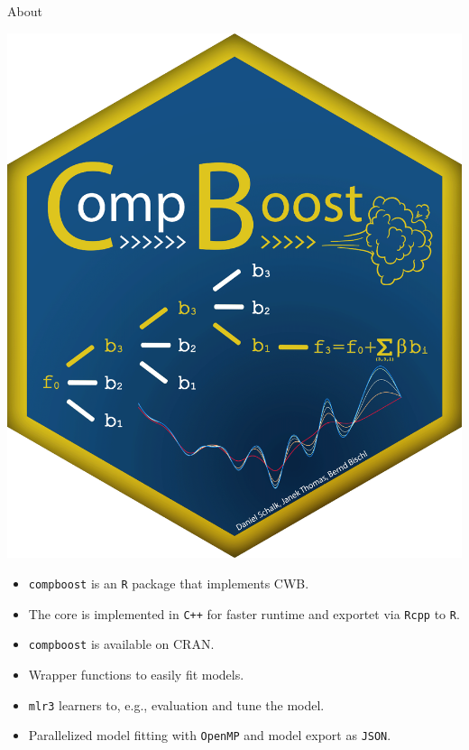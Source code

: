 \documentclass[t,10pt]{beamer}
\begin{document}
\begin{frame}{About}
  \begin{minipage}[t]{0.18\textwidth}
    \includegraphics[width=\linewidth]{figures/fig-compboost-logo.png}
  \end{minipage}
  \begin{minipage}{0.8\textwidth}
  \begin{itemize}
    \item
      \texttt{compboost} is an \texttt{R} package that implements CWB.
    \item
      The core is implemented in \texttt{C++} for faster runtime and exportet via \texttt{Rcpp} to \texttt{R}.
    \item
      \texttt{compboost} is available on CRAN.
    \item
      Wrapper functions to easily fit models.
    \item
      \texttt{mlr3} learners to, e.g., evaluation and tune the model.
    \item
      Parallelized model fitting with \texttt{OpenMP} and model export as \texttt{JSON}.
  \end{itemize}
  \end{minipage}
\end{frame}
\end{document}

